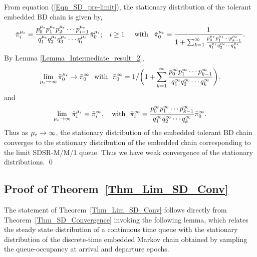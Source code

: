  
	From equation (\ref{Eqn_SD_pre-limit}), the stationary distribution of the tolerant embedded BD chain is given by,
	\begin{eqnarray}
	\label{Eqn_SD}
	\tilde{\pi}_i^{\mu_\epsilon} = \frac{p_0^{\mu_\epsilon} p_1^{\mu_\epsilon} p_2^{\mu_\epsilon} \cdots p_{i-1}^{\mu_\epsilon}}{q_1^{\mu_\epsilon} q_2^{\mu_\epsilon} q_3^{\mu_\epsilon} \cdots q_i^{\mu_\epsilon}} \tilde{\pi}_0^{\mu_\epsilon} ; \hspace{0.3cm} i \geq 1 \hspace{0.5cm}\mbox{with} \hspace{0.3cm} \tilde{\pi}_0^{\mu_\epsilon} = \frac{1}{1 + \sum_{k = 1}^{\infty} \frac{p_0^{\mu_\epsilon} p_1^{\mu_\epsilon} \cdots p_{k-1}^{\mu_\epsilon}}{q_1^{\mu_\epsilon} q_2^{\mu_\epsilon} \cdots q_k^{\mu_\epsilon}}}. 
	\end{eqnarray} 
	By Lemma \ref{Lemma_Intermediate_result_2},  
	\begin{eqnarray}
	\label{Eqn_pi_0_conv}
	\lim \limits_{{\mu_\epsilon} \to \infty} \tilde{\pi}_0^{\mu_\epsilon} \to \tilde{\pi}_0^\infty \ \ \mbox{with} \ \ \tilde{\pi}_0^\infty  = 1 \big/ \bigg( 1 + \sum_{k = 1}^{\infty} \frac{p_0^{\infty} p_1^{\infty} \cdots p_{k-1}^{\infty}}{q_1^{\infty} q_2^{\infty} \cdots q_k^{\infty}} \bigg).  
	\end{eqnarray}
	and
	\begin{eqnarray}
	\label{Eqn_tilde_pi_conv}
	\lim \limits_{\mue \to \infty} \tilde{\pi}_i^\mue = \tilde{\pi}_i^\infty,  \ \   \mbox{ with } \ 
	\tilde{\pi}_i^\infty  = \frac{p_0^{\infty} p_1^{\infty} \cdots p_{k-1}^{\infty}}{q_1^{\infty} q_2^{\infty} \cdots q_k^{\infty}} \tilde{\pi}_0^\infty.
	\end{eqnarray}
	Thus as ${\mu_\epsilon} \to \infty$, the stationary distribution of the
        embedded tolerant BD chain converges to the stationary
        distribution of the embedded chain corresponding to the limit
        SDSR-M/M/1 queue. Thus we have weak convergence of the
        stationary distributions. \qed

        \subsection{Proof of Theorem~\ref{Thm_Lim_SD_Conv}}
        \label{sec:Thm_Lim_SD_Conv}
        
        The statement of Theorem~\ref{Thm_Lim_SD_Conv} follows
        directly from Theorem~\ref{Thm_SD_Convergence} invoking the
        following lemma, which relates the steady state distribution
        of a continuous time queue with the stationary distribution of
        the discrete-time embedded Markov chain obtained by sampling
        the queue-occupancy at arrival and departure epochs.

